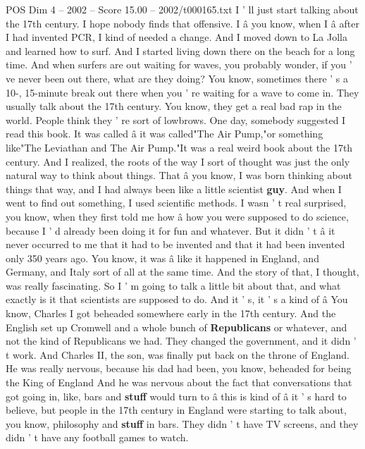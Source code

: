 \begin{textsample}{POS Dim 4 – 2002 – Score 15.00 – 2002/t000165.txt}  \label{ex:f4_pos_025}
I ' ll just start talking about the 17th century.
I hope nobody finds that offensive.
I â you know, when I â after I had invented PCR, I kind of needed a change.
And I moved down to La Jolla and learned how to surf.
And I started living down there on the beach for a long time.
And when surfers are out waiting for waves, you probably wonder, if you ' ve never been out there, what are they doing?
You know, sometimes there ' s a 10-, 15-minute break out there when you ' re waiting for a wave to come in.
They usually talk about the 17th century.
You know, they get a real bad rap in the world.
People think they ' re sort of lowbrows.
One day, somebody suggested I read this book.
It was called â it was called"The Air Pump,"or something like"The Leviathan and The Air Pump."It was a real weird book about the 17th century.
And I realized, the roots of the way I sort of thought was just the only natural way to think about things.
That â you know, I was born thinking about things that way, and I had always been like a little scientist \textbf{guy}.
And when I went to find out something, I used scientific methods.
I wasn ' t real surprised, you know, when they first told me how â how you were supposed to do science, because I ' d already been doing it for fun and whatever.
But it didn ' t â it never occurred to me that it had to be invented and that it had been invented only 350 years ago.
You know, it was â like it happened in England, and Germany, and Italy sort of all at the same time.
And the story of that, I thought, was really fascinating.
So I ' m going to talk a little bit about that, and what exactly is it that scientists are supposed to do.
And it ' s, it ' s a kind of â You know, Charles I got beheaded somewhere early in the 17th century.
And the English set up Cromwell and a whole bunch of \textbf{Republicans} or whatever, and not the kind of Republicans we had.
They changed the government, and it didn ' t work.
And Charles II, the son, was finally put back on the throne of England.
He was really nervous, because his dad had been, you know, beheaded for being the King of England And he was nervous about the fact that conversations that got going in, like, bars and \textbf{stuff} would turn to â this is kind of â it ' s hard to believe, but people in the 17th century in England were starting to talk about, you know, philosophy and \textbf{stuff} in bars.
They didn ' t have TV screens, and they didn ' t have any football games to watch.

\end{textsample}
